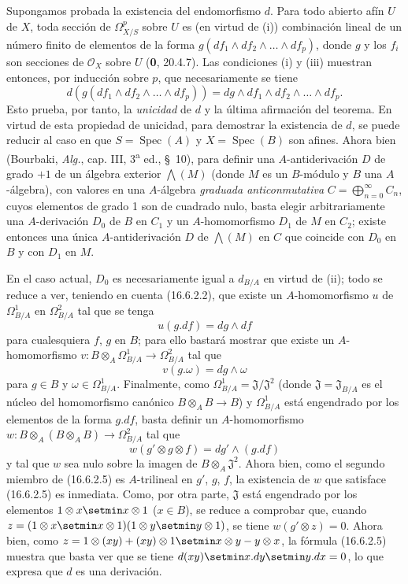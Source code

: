 Supongamos probada la existencia del endomorfismo $d$. Para todo abierto afín
$U$ de $X$, toda sección de $\varOmega_{X/S}^p$ sobre $U$ es (en virtud
de (i)) combinación lineal de un número finito de elementos de la forma
$g(df_1\wedge df_2\wedge\ldots\wedge df_p)$, donde $g$ y los $f_i$ son
secciones de $\mathcal{O}_X$ sobre $U$ (\textbf 0, 20.4.7). Las condiciones (i)
y (iii) muestran entonces, por inducción sobre $p$, que necesariamente se tiene
\[
  d(g(df_1\wedge df_2\wedge\ldots\wedge df_p))
  =dg\wedge df_1\wedge df_2\wedge\ldots\wedge df_p.
  \tag{16.6.2.2}
  \label{IV.16.6.2.2}
\]
Esto prueba, por tanto, la \emph{unicidad} de $d$ y la última afirmación del teorema.
En virtud de esta propiedad de unicidad, para demostrar la existencia de $d$, se
puede reducir al caso en que $S=\operatorname{Spec}(A)$ y
$X=\operatorname{Spec}(B)$ son afines. Ahora bien (Bourbaki, \emph{Alg.}, cap.
III, 3\textsuperscript{a} ed., \S~10), para definir una $A$-antiderivación
$D$ de grado $+1$ de un álgebra exterior $\bigwedge(M)$ (donde $M$ es un
$B$-módulo y $B$ una $A$-álgebra), con valores en una
$A$-álgebra \emph{graduada anticonmutativa}
$C=\bigoplus_{n=0}^{\infty}C_n$, cuyos elementos de grado 1 son de cuadrado
nulo, basta elegir arbitrariamente una $A$-derivación $D_0$ de $B$
en $C_1$ y un $A$-homomorfismo $D_1$ de $M$ en $C_2$; existe entonces
una única $A$-antiderivación $D$ de $\bigwedge(M)$ en $C$
que coincide con $D_0$ en $B$ y con $D_1$ en $M$.

En el caso actual, $D_0$ es necesariamente igual a $d_{B/A}$ en virtud de
(ii); todo se reduce a ver, teniendo en cuenta (16.6.2.2), que existe un
$A$-homomorfismo $u$ de $\Omega_{B/A}^1$ en $\Omega_{B/A}^2$ tal que
se tenga
\[
  u(g.df)=dg\wedge df
  \tag{16.6.2.3}
  \label{IV.16.6.2.3}
\]
para cualesquiera $f$, $g$ en $B$; para ello bastará mostrar que
existe un $A$-homomorfismo
$v:B\otimes_A\Omega_{B/A}^1\to\Omega_{B/A}^2$ tal que
\[
  v(g.\omega)=dg\wedge\omega
  \tag{16.6.2.4}
  \label{IV.16.6.2.4}
\]
para $g\in B$ y $\omega\in\Omega_{B/A}^1$. Finalmente, como
$\Omega_{B/A}^1=\mathfrak J/\mathfrak J^2$ (donde
$\mathfrak J=\mathfrak J_{B/A}$ es el núcleo del homomorfismo canónico
$B\otimes_A B\to B$) y $\Omega_{B/A}^1$ está engendrado por los elementos
de la forma $g.df$, basta definir un $A$-homomorfismo
$w:B\otimes_A(B\otimes_A B)\to\Omega_{B/A}^2$ tal que
\[
  w(g'\otimes g\otimes f)=dg'\wedge(g.df)
  \tag{16.6.2.5}
  \label{IV.16.6.2.5}
\]
y tal que $w$ sea nulo sobre la imagen de $B\otimes_A\mathfrak J^2$. Ahora bien,
como el segundo miembro de (16.6.2.5) es $A$-trilineal en $g'$, $g$, $f$,
la existencia de $w$ que satisface (16.6.2.5) es inmediata. Como, por otra parte,
$\mathfrak J$ está engendrado por los elementos $1\otimes x\setmin x\otimes1$
($x\in B$), se reduce a comprobar que, cuando
$z=(1\otimes x\setmin x\otimes1)(1\otimes y\setmin y\otimes1)$, se tiene
$w(g'\otimes z)=0$. Ahora bien, como
$z=1\otimes(xy)+(xy)\otimes1\setmin x\otimes y-y\otimes x$, la fórmula (16.6.2.5)
muestra que
basta ver que se tiene $d(xy)\setmin x.dy\setmin y.dx=0$, lo que expresa que $d$ es una
derivación.

